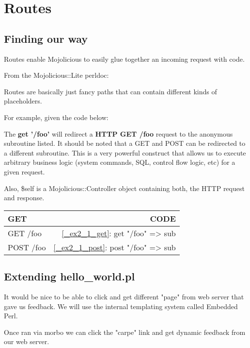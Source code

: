 \documentclass[14pt]{extreport}
\newcommand\Small{\fontsize{10}{10.2}\selectfont}
\newcommand*\LSTfont{\Small\ttfamily\SetTracking{encoding=*}{-60}\lsstyle}
\begin{document}
\section{Routes}

\subsection{Finding our way}

Routes enable Mojolicious to easily glue together an incoming request with
code.

From the Mojolicious::Lite perldoc:

Routes are basically just fancy paths that can contain different kinds of
placeholders.

For example, given the code below:



The \textbf{get '/foo'} will redirect a \textbf{HTTP GET /foo} request to the anonymous
subroutine listed. It should be noted that a GET and POST can be redirected to
a different subroutine.  This is a very powerful construct that allows us to
execute arbitrary business logic (system commands, SQL, control flow logic,
etc) for a given request.

Also, \$self is a Mojolicious::Controller object containing both, the HTTP
request and response.

\begin{center}
  \begin{tabular}{|l|r|}
    \hline
    GET  & CODE\\
    \hline
    GET /foo & \ref{_ex2_1_get}: get "/foo" => sub {}\\
    POST /foo & \ref{_ex2_1_post}: post "/foo" => sub {}\\
    \hline
  \end{tabular}
\end{center}

\subsection{Extending hello\_world.pl}

It would be nice to be able to click and get different "page" from web server
that gave us feedback. We will use the internal templating system called
Embedded Perl.



Once ran via morbo we can click the "carpe" link and get dynamic feedback from our web server.
\end{document}
